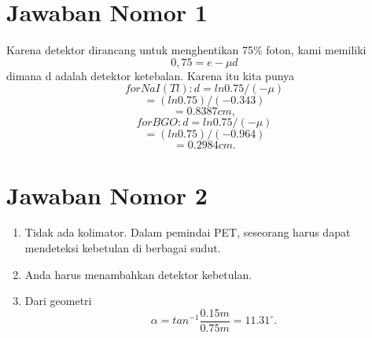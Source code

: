 \section{Jawaban Nomor 1}
Karena detektor dirancang untuk menghentikan 75\% foton, kami memiliki \begin{displaymath} 0,75 = e-\mu d\end{displaymath} dimana d adalah detektor 
ketebalan. Karena itu kita punya
\center
\begin{displaymath}
for NaI(Tl) : d = ln0.75/(-\mu) 
\end{displaymath}
\begin{displaymath}
= (ln0.75)/(-0.343) 
\end{displaymath}
\begin{displaymath}
= 0.8387 cm, 
\end{displaymath}
\begin{displaymath}
for BGO : d = ln0.75/(-\mu) 
\end{displaymath}
\begin{displaymath}
= (ln0.75)/(-0.964)
\end{displaymath} 
\begin{displaymath}
= 0.2984 cm.
\end{displaymath}
\section{Jawaban Nomor 2}
\begin{enumerate}
	\item Tidak ada kolimator. Dalam pemindai PET, seseorang harus dapat mendeteksi kebetulan di berbagai sudut.
	\item Anda harus menambahkan detektor kebetulan.
	\item Dari geometri \begin{displaymath}
				\alpha = tan^{-1}\frac {0.15 m}{0.75 m}
					= 11.31^\circ.
				\end{displaymath}
\end{enumerate}
